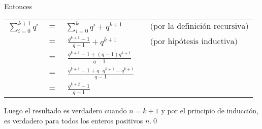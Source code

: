 \documentclass[handout]{beamer} %
\begin{document}
\begin{frame}
    \frametitle{}

    Entonces

    \medskip
    
    
    \begin{tabular}{lllll}
        $\displaystyle\sum_{i=0}^{k+1} q^i $ &$=$& $\displaystyle\sum_{i=0}^{k} q^i  + q^{k+1}$ &\qquad &$\text{(por la definición recursiva)}$ \\[0.6cm]
    &$=$& $\displaystyle\ \frac{q^{k+1}-1}{q -1}+ q^{k+1}$ &\qquad &$\text{(por hipótesis inductiva)}$ \\[0.6cm]
    &$=$& $\displaystyle\ \frac{q^{k+1}-1+ (q-1) q^{k+1}}{q -1}$ &\qquad & \\[0.6cm]
    &$=$& $\displaystyle\ \frac{q^{k+1}-1+ q\cdot q^{k+1}- q^{k+1}}{q -1}$ &\qquad &\\[0.6cm]
    &$=$& $\displaystyle\ \frac{q^{k+2}-1}{q -1}$ &\qquad &
    \end{tabular}
    \medskip
    \pause
    
    Luego el resultado es verdadero cuando $n=k+1$ y por el principio de inducción, es verdadero para todos los enteros positivos $n$.\qed

\end{frame}
\end{document}
